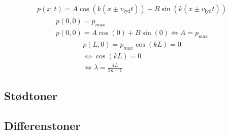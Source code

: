 \begin{gather}
    p(x,t)=A\cos(k(x\pm v_{\mathrm{lyd}}t))+B\sin(k(x\pm v_{\mathrm{lyd}}t))
\end{gather}
\begin{gather}
    p(0,0)=p_{max}\\
    p(0,0)=A\cos(0)+B\sin(0) \Leftrightarrow{A=p_{\max}}
\end{gather}
\begin{gather}
    p(L,0)=p_{max}\cos(kL)=0\\
    \Leftrightarrow \cos(kL)=0\\
    \Leftrightarrow \lambda = \frac{4L}{2n-1}
\end{gather}




\subsection{Stødtoner}

\subsection{Differenstoner}